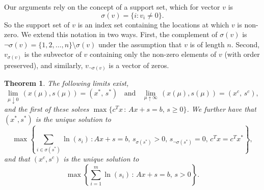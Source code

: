 \documentclass{article}
\newtheorem{theorem}{Theorem}
\begin{document}
Our arguments rely on the concept of a support set, which for vector 
$v$ is
\[
\sigma(v) = \{ i : v_i \neq 0 \}.
\]
So the support set of $v$ is an index set containing the locations
at which $v$ is non-zero. We extend this notation in two ways. First,
the complement of $\sigma(v)$ is 
$\neg \sigma(v) = \{1, 2, \ldots, n\} \setminus \sigma(v)$ under the
assumption that $v$ is of length $n$. Second, $v_{\sigma(v)}$ is the
subvector of $v$ containing only the non-zero elements of $v$ (with order
preserved), and similarly, $v_{\neg \sigma(v)}$ is a vector of zeros. 
\begin{theorem} \label{thm-converge}
The following limits exist,
\[
\lim_{\mu \downarrow 0} \, (x(\mu), s(\mu)) = (x^*, \, s^*) \;\; \mbox{ and } \;\;
\lim_{\mu \uparrow \infty} \, (x(\mu), s(\mu)) = (x^c, \, s^c),
\]
and the first of these solves $\max \{ c^T x \, : \, Ax + s = b, \, s \ge 0 \}$.
We further have that $(x^*, s^*)$ is the unique solution to
\begin{equation} \label{eq-primalOptAC}
\max \left\{ \sum_{i \in \sigma(s^*)} \ln(s_i) \, : 
        Ax + s = b, \, s_{\sigma(s^*)} > 0, \, s_{\neg\sigma(s^*)} = 0, \, 
        c^T x = c^T x^* \right\}, 
\end{equation}
and that $(x^c, s^c)$ is the unique solution to
\begin{equation} \label{eq-primalAc}
\max \left\{ \sum_{i=1}^{m} \ln(s_i) \, : \, Ax + s = b, \, s > 0 \right\}.
\end{equation}
\end{theorem}
\end{document}
